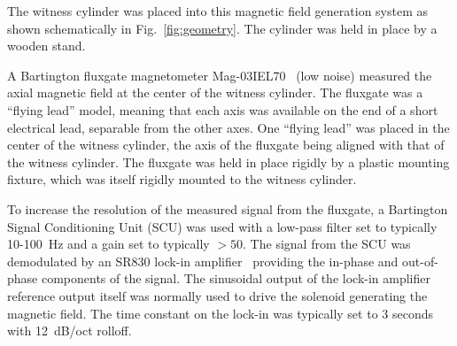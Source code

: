 The witness cylinder was placed into this magnetic field generation
system as shown schematically in Fig.~\ref{fig:geometry}.  The
cylinder was held in place by a wooden stand.

A Bartington fluxgate magnetometer Mag-03IEL70~\cite{bib:bartman} (low
noise) measured the axial magnetic field at the center of the witness
cylinder.  The fluxgate was a ``flying lead'' model, meaning that each
axis was available on the end of a short electrical lead, separable
from the other axes.  One ``flying lead'' was placed in the center of
the witness cylinder, the axis of the fluxgate being aligned with that
of the witness cylinder.  The fluxgate was held in place rigidly by a
plastic mounting fixture, which was itself rigidly mounted to the
witness cylinder.

To increase the resolution of the measured signal from the fluxgate, a
Bartington Signal Conditioning Unit (SCU) was used with a low-pass
filter set to typically 10-100~Hz and a gain set to typically $>50$.
The signal from the SCU was demodulated by an SR830 lock-in
amplifier~\cite{bib:lockin} providing the in-phase and out-of-phase
components of the signal.  The sinusoidal output of the lock-in
amplifier reference output itself was normally used to drive the
solenoid generating the magnetic field.  The time constant on the
lock-in was typically set to 3 seconds with 12~dB/oct rolloff.

